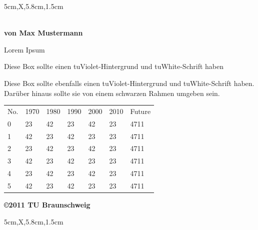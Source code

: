 \documentclass[a3paper,style=scifi,table,scifiposter]{tubsposter}
\begin{document}
\begin{modulepage}[sender=top,bgcolor=tuBlue]{5cm,X,5.8cm,1.5cm}
  \showtubslogo[right]
  \begin{posterrow}[bgcolor=tuOrangeDark80,fgcolor=tuWhite]
    \bfseries{}\\[1em]
    von Max Mustermann
  \end{posterrow}
  \begin{posterrow}[X,X]
    \begin{postercol}
      {Lorem Ipsum}\\[2ex]
      \lipsum[1-2]
    \end{postercol}
    \begin{postercol}[bgcolor=tuViolet,fgcolor=tuWhite,X,X]
      \begin{postersubrow}
        Diese Box sollte einen tuViolet-Hintergrund und tuWhite-Schrift haben
      \end{postersubrow}
      \begin{postersubrow}[frame=fbox]
        Diese Box sollte ebenfalls einen tuViolet-Hintergrund und tuWhite-Schrift haben.\\
        Darüber hinaus sollte sie von einem schwarzen Rahmen umgeben sein.
      \end{postersubrow}
    \end{postercol}
  \end{posterrow}
  \begin{modrow*}
    \large
     
    \begin{tabularx}{\textwidth}{lXXXXXX}
      \rowcolor{tuGray20}
      No. & 1970 & 1980 & 1990 & 2000 & 2010 & Future \\
      0   & 23   & 42   & 23   & 42   & 23   & 4711 \\
      1   & 42   & 23   & 42   & 23   & 23   & 4711 \\
      2   & 23   & 42   & 23   & 42   & 23   & 4711 \\
      3   & 42   & 23   & 42   & 23   & 23   & 4711 \\
      4   & 23   & 42   & 23   & 42   & 23   & 4711 \\
      5   & 42   & 23   & 42   & 23   & 23   & 4711 \\
    \end{tabularx}
  \end{modrow*}
  \begin{modrow}[bgcolor=tuGreen]
    \bfseries\raggedleft\textcolor{tuWhite}{\copyright 2011 TU Braunschweig}
  \end{modrow}
\end{modulepage}

  \begin{modulepage}[sender=bottom,bgcolor=tuVioletLight]{5cm,X,5.8cm,1.5cm}
  \end{modulepage}
  
\end{document}
